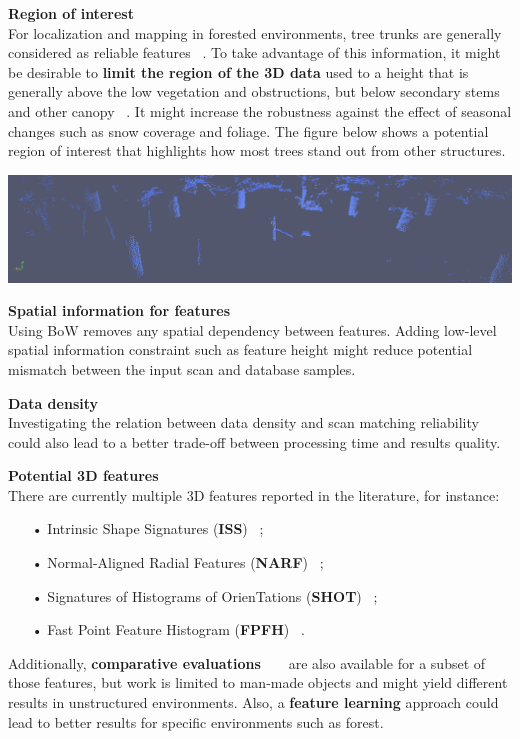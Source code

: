 \documentclass[a0paper,portrait]{baposter}
\begin{document}
\begin{poster}
{        \textbf{Region of interest}\\
        For localization and mapping in forested environments, tree trunks are generally considered as reliable features ~\cite{Song2012}. To take advantage of this information, it might be desirable to \textbf{limit the region of the 3D data} used to a height that is generally above the low vegetation and obstructions, but below secondary stems and other canopy ~\cite{Mcdaniel2012}. It might increase the robustness against the effect of seasonal changes such as snow coverage and foliage. The figure below shows a potential region of interest that highlights how most trees stand out from other structures.
        \begin{center}
            \includegraphics[width=0.95\linewidth]{./figures/pointcloudSlice.png}
        \end{center}

        \textbf{Spatial information for features}\\
        Using BoW removes any spatial dependency between features. Adding low-level spatial information constraint such as feature height might reduce potential mismatch between the input scan and database samples.\vspace{1em}

        \textbf{Data density}\\
        Investigating the relation between data density and scan matching reliability could also lead to a better trade-off between processing time and results quality.\vspace{1em}

        \textbf{Potential 3D features}\\
        There are currently multiple 3D features reported in the literature, for instance:
        \begin{itemize}
            \item[•] Intrinsic Shape Signatures (\textbf{ISS}) ~\cite{Yu2009};
            \item[•] Normal-Aligned Radial Features (\textbf{NARF}) ~\cite{Steder2011};
            \item[•] Signatures of Histograms of OrienTations (\textbf{SHOT}) ~\cite{Tombari2010};
            \item[•] Fast Point Feature Histogram (\textbf{FPFH}) ~\cite{Rusu2009}.
        \end{itemize}
        Additionally, \textbf{comparative evaluations} ~\cite{Boyer2011} ~\cite{Filipe2014} are also available for a subset of those features, but work is limited to man-made objects and might yield different results in unstructured environments. Also, a \textbf{feature learning} approach could lead to better results for specific environments such as forest.\vspace{1em}

}
\end{poster}
\end{document}
